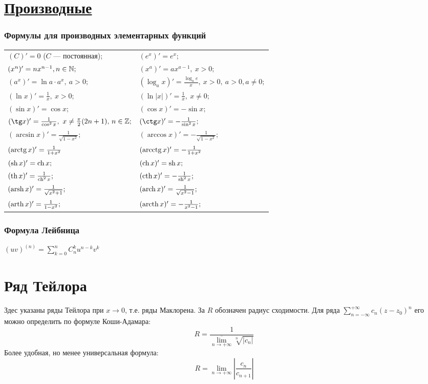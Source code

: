 \section[Производные]{\href{https://ru.wikipedia.org/wiki/\%D0\%9F\%D1\%80\%D0\%BE\%D0\%B8\%D0\%B7\%D0\%B2\%D0\%BE\%D0\%B4\%D0\%BD\%D0\%B0\%D1\%8F\_\%D1\%84\%D1\%83\%D0\%BD\%D0\%BA\%D1\%86\%D0\%B8\%D0\%B8}{Производные}}

\subsubsection{Формулы для производных элементарных функций}
\noindent\begin{longtable}[l]{ l l }
$(C)'=0$ ($C$ --- постоянная); 
&
$(e^x)'=e^x;$
\\
$(x^n)' = nx^{n-1}, n\in \mathbb{N};$
&
$(x^a)'=ax^{a-1},\ x>0;$
\\
$(a^x)'=\ln a\cdot a^x,\ a>0;$
&
$(\log_a x)'=\frac{\log_a e}{x},\ x>0,\ a>0, a\ne 0;$
\\
$(\ln x)' = \frac{1}{x},\ x>0;$
&
$(\ln |x|)' = \frac{1}{x},\ x\ne 0;$
\\
$(\sin x)'=\cos x;$
&
$(\cos x)'=-\sin x;$
\\
$(\tg x)'= \frac{1}{\cos^2 x},\ x \ne \frac{\pi}{2}(2n+1),\, n\in \bbZ;$
&
$(\ctg x)'= -\frac{1}{\sin^2 x};$ 
\\
$(\arcsin x)' = \frac{1}{\sqrt{1-x^2}};$
&
$(\arccos x)' = -\frac{1}{\sqrt{1-x^2}};$
\\
$(\mathop{\rm arctg}\nolimits x)' = \frac{1}{1+x^2}$
&
$(\mathop{\rm arcctg}\nolimits x)' = -\frac{1}{1+x^2}$
\\
$(\mathop{\rm sh}\nolimits x)'= \mathop{\rm ch}\nolimits x;$
&
$(\mathop{\rm ch}\nolimits x)'= \mathop{\rm sh}\nolimits x;$
\\
$(\mathop{\rm th}\nolimits x)'= \frac{1}{\mathop{\rm ch}\nolimits^2 x};$
&
$(\mathop{\rm cth}\nolimits x)'= -\frac{1}{\mathop{\rm sh}\nolimits^2 x};$
\\
$(\mathop{\rm arsh}\nolimits x)'=\frac{1}{\sqrt{x^2+1}};$
&
$(\mathop{\rm arch}\nolimits x)'=\frac{1}{\sqrt{x^2-1}};$
\\
$(\mathop{\rm arth}\nolimits x)'=\frac{1}{1-x^2};$
&
$(\mathop{\rm arcth}\nolimits x)'=-\frac{1}{x^2-1};$
\end{longtable}
\subsubsection{Формула Лейбница}
$(uv)^{(n)}=\sum\limits^n_{k=0} C^k_n u^{n-k} v^{k}$

\section[Ряд Тейлора]{Ряд Тейлора}

\begin{notion}
Здес указаны ряды Тейлора при $x \to 0$, т.е. ряды Маклорена. За $R$ обозначен радиус сходимости. Для ряда $\sum\limits_{n=-\infty}^{+\infty} c_n (z-z_0)^n $ его можно определить по формуле Коши-Адамара:
$$
R = \frac{1}{\overline{\lim\limits_{n \to + \infty}} \sqrt[n]{|c_n|}}
$$
Более удобная, но менее универсальная формула:$$
R = \lim\limits_{n \to + \infty} \left| \frac{c_n}{c_{n + 1}} \right|
$$
\end{notion}



